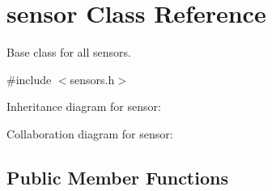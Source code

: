 \hypertarget{classsensor}{}\section{sensor Class Reference}
\label{classsensor}


Base class for all sensors.  




{\ttfamily \#include $<$sensors.\+h$>$}



Inheritance diagram for sensor\+:


Collaboration diagram for sensor\+:
\subsection*{Public Member Functions}
